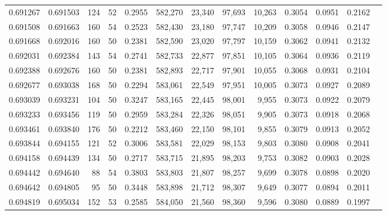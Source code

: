 \begin{tabular}{rrrrrrrrrrrrr}
0.691267 & 0.691503 &   124 &  52 &                                     0.2955 & 582,270 &  23,340 &  97,693 &  10,263 & 0.3054 & 0.0951 & 0.2162 \\
0.691508 & 0.691663 &   160 &  54 &                                     0.2523 & 582,430 &  23,180 &  97,747 &  10,209 & 0.3058 & 0.0946 & 0.2147 \\
0.691668 & 0.692016 &   160 &  50 &                                     0.2381 & 582,590 &  23,020 &  97,797 &  10,159 & 0.3062 & 0.0941 & 0.2132 \\
0.692031 & 0.692384 &   143 &  54 &                                     0.2741 & 582,733 &  22,877 &  97,851 &  10,105 & 0.3064 & 0.0936 & 0.2119 \\
0.692388 & 0.692676 &   160 &  50 &                                     0.2381 & 582,893 &  22,717 &  97,901 &  10,055 & 0.3068 & 0.0931 & 0.2104 \\
0.692677 & 0.693038 &   168 &  50 &                                     0.2294 & 583,061 &  22,549 &  97,951 &  10,005 & 0.3073 & 0.0927 & 0.2089 \\
0.693039 & 0.693231 &   104 &  50 &                                     0.3247 & 583,165 &  22,445 &  98,001 &   9,955 & 0.3073 & 0.0922 & 0.2079 \\
0.693233 & 0.693456 &   119 &  50 &                                     0.2959 & 583,284 &  22,326 &  98,051 &   9,905 & 0.3073 & 0.0918 & 0.2068 \\
0.693461 & 0.693840 &   176 &  50 &                                     0.2212 & 583,460 &  22,150 &  98,101 &   9,855 & 0.3079 & 0.0913 & 0.2052 \\
0.693844 & 0.694155 &   121 &  52 &                                     0.3006 & 583,581 &  22,029 &  98,153 &   9,803 & 0.3080 & 0.0908 & 0.2041 \\
0.694158 & 0.694439 &   134 &  50 &                                     0.2717 & 583,715 &  21,895 &  98,203 &   9,753 & 0.3082 & 0.0903 & 0.2028 \\
0.694442 & 0.694640 &    88 &  54 &                                     0.3803 & 583,803 &  21,807 &  98,257 &   9,699 & 0.3078 & 0.0898 & 0.2020 \\
0.694642 & 0.694805 &    95 &  50 &                                     0.3448 & 583,898 &  21,712 &  98,307 &   9,649 & 0.3077 & 0.0894 & 0.2011 \\
0.694819 & 0.695034 &   152 &  53 &                                     0.2585 & 584,050 &  21,560 &  98,360 &   9,596 & 0.3080 & 0.0889 & 0.1997 \\

\end{tabular}
